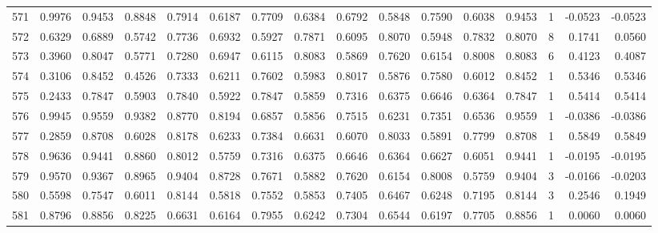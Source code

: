 \begin{tabular}{lrrrrrrrrrrrrrrr}
571 &      0.9976 &  0.9453 &  0.8848 &  0.7914 &  0.6187 &  0.7709 &  0.6384 &  0.6792 &  0.5848 &  0.7590 &   0.6038 &     0.9453 &      1 &                   -0.0523 &                    -0.0523 \\
572 &      0.6329 &  0.6889 &  0.5742 &  0.7736 &  0.6932 &  0.5927 &  0.7871 &  0.6095 &  0.8070 &  0.5948 &   0.7832 &     0.8070 &      8 &                    0.1741 &                     0.0560 \\
573 &      0.3960 &  0.8047 &  0.5771 &  0.7280 &  0.6947 &  0.6115 &  0.8083 &  0.5869 &  0.7620 &  0.6154 &   0.8008 &     0.8083 &      6 &                    0.4123 &                     0.4087 \\
574 &      0.3106 &  0.8452 &  0.4526 &  0.7333 &  0.6211 &  0.7602 &  0.5983 &  0.8017 &  0.5876 &  0.7580 &   0.6012 &     0.8452 &      1 &                    0.5346 &                     0.5346 \\
575 &      0.2433 &  0.7847 &  0.5903 &  0.7840 &  0.5922 &  0.7847 &  0.5859 &  0.7316 &  0.6375 &  0.6646 &   0.6364 &     0.7847 &      1 &                    0.5414 &                     0.5414 \\
576 &      0.9945 &  0.9559 &  0.9382 &  0.8770 &  0.8194 &  0.6857 &  0.5856 &  0.7515 &  0.6231 &  0.7351 &   0.6536 &     0.9559 &      1 &                   -0.0386 &                    -0.0386 \\
577 &      0.2859 &  0.8708 &  0.6028 &  0.8178 &  0.6233 &  0.7384 &  0.6631 &  0.6070 &  0.8033 &  0.5891 &   0.7799 &     0.8708 &      1 &                    0.5849 &                     0.5849 \\
578 &      0.9636 &  0.9441 &  0.8860 &  0.8012 &  0.5759 &  0.7316 &  0.6375 &  0.6646 &  0.6364 &  0.6627 &   0.6051 &     0.9441 &      1 &                   -0.0195 &                    -0.0195 \\
579 &      0.9570 &  0.9367 &  0.8965 &  0.9404 &  0.8728 &  0.7671 &  0.5882 &  0.7620 &  0.6154 &  0.8008 &   0.5759 &     0.9404 &      3 &                   -0.0166 &                    -0.0203 \\
580 &      0.5598 &  0.7547 &  0.6011 &  0.8144 &  0.5818 &  0.7552 &  0.5853 &  0.7405 &  0.6467 &  0.6248 &   0.7195 &     0.8144 &      3 &                    0.2546 &                     0.1949 \\
581 &      0.8796 &  0.8856 &  0.8225 &  0.6631 &  0.6164 &  0.7955 &  0.6242 &  0.7304 &  0.6544 &  0.6197 &   0.7705 &     0.8856 &      1 &                    0.0060 &                     0.0060 \\

\end{tabular}
